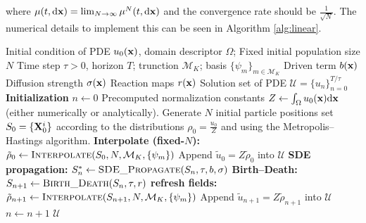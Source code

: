 \documentclass[12pt]{article}
\begin{document}
where $\mu(t,\mathrm{d}\mathbf{x})= \lim_{N\to\infty}\mu^N(t,\mathrm{d} \mathbf{x})$ and the convergence rate should be $\frac{1}{\sqrt{N}}$.
The numerical details to implement this can be seen in Algorithm \ref{alg:linear}.
\begin{algorithm}
    \caption{Linear Stochastic Branching} \label{alg:linear}
    \begin{algorithmic}
        \Require Initial condition of PDE $u_0(\mathbf{x})$, domain descriptor $\Omega$;
        \Require Fixed initial population size $N$
        \Require Time step $\tau>0$, horizon $T$; trunction $\mathcal M_K$; basis $\{\psi_m\}_{m\in\mathcal M_K}$
        \Require Driven term $b(\mathbf{x})$
        \Require Diffusion strength $\sigma(\mathbf{x})$
        \Require Reaction maps $r(\mathbf{x})$
        \Ensure  Solution set of PDE $\mathcal U = \{u_n\}_{n=0}^{T/\tau}$
        \State \textbf{Initialization}
        \State $n\gets 0$
        \State Precomputed normalization constants  $Z\gets \int_\Omega u_0(\mathbf{x})\mathrm{d} \mathbf{x}$  (either numerically or analytically).
        \State Generate $N$ initial particle positions set $S_0=\{\mathbf{X}^i_0\}$ according to the distributions $\rho_0=\frac{u_0}{Z}$ and using the Metropolis--Hastings algorithm.
        \State \textbf{Interpolate (fixed-$N$):}
        \State $\tilde\rho_0 \gets \textsc{Interpolate}(S_0,N,\mathcal M_K,\{\psi_m\})$
        \State Append $\tilde u_0 = Z\tilde \rho_0$ into $\mathcal U$
            \State \textbf{SDE propagation:}
            \State $S_n^*\gets \textsc{SDE\_Propagate}(S_n,\tau,b,\sigma)$
            \State \textbf{Birth--Death:}
            \State $S_{n+1}\gets \textsc{Birth\_Death}(S_{n},\tau,r)$
            \State \textbf{refresh fields:}
            \State $\tilde\rho_{n+1} \gets \textsc{Interpolate}(S_{n+1},N,\mathcal M_K,\{\psi_m\})$
            \State Append $\tilde u_{n+1} = Z\tilde \rho_{n+1}$ into $\mathcal U$
            \State $n\gets n+1$
        \EndWhile
        \State \Return $\mathcal U$
        \EndProcedure
    \end{algorithmic}
\end{algorithm}
\end{document}
